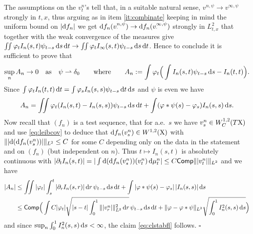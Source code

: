 \documentclass[11pt]{article}
\numberwithin{equation}{section}
\newenvironment{idea}{\removelastskip\par\medskip   %
\noindent{\em Idea of the proof} \rm}{\penalty-20\null\hfill$\square$\par\medbreak}
\newcommand{\X}{{\rm X}}
\renewcommand{\d}{{\rm d}}
\newcommand{\weakto}{\rightharpoonup}
\newcommand{\Comp}{{\sf Comp}}
\begin{document}
\begin{idea}
The  assumptions on the $v^n_t$'s tell that, in a suitable natural sense, $v^{n,\psi}\to v^{\infty,\psi}$ strongly in $t,x$, thus arguing as in item \ref{it:combinate} keeping in mind the uniform bound on $|\d f_n|$ we get $\d f_n(v^{n,\psi}_\cdot)\to \d f_n(v^{\infty,\psi}_\cdot)$ strongly in $L^2_{t,x}$ that together with the weak convergence of the measures give $\iint\varphi_tI_n(s,t)\psi_{t-s}\,\d s\,\d t\to \iint\varphi_tI_\infty(s,t)\psi_{t-s}\,\d s\,\d t$. Hence  to conclude it is sufficient to prove that 
\begin{equation}
\label{eq:clstabfl}
\sup_nA_{n}\to 0\quad\text{as}\quad\psi\weakto\delta_0\qquad\text{where}\qquad A_n:=\int\varphi_t\Big(\int I_n(s,t)\psi_{t-s}\,\d s-I_n(t,t)\Big).
\end{equation}
Since $\int\varphi_tI_n(t,t)\,\d t=\int \varphi_sI_n(s,s)\psi_{t-s}\,\d t\,\d s$ and  $\psi$ is  even we have
\[
\begin{split}
A_{n}=\iint\varphi_t  (I_n(s,t)-I_n(s,s))\psi_{t-s}\,\d s \,\d t +\int (\varphi\ast\psi(s)-\varphi_s)I_n(s,s)\,\d s.
\end{split}
\]
Now recall that $(f_n)$ is a test sequence, that for a.e.\ $s$ we have  $v^n_s\in W^{1,2}_C(T\X)$ and use \eqref{eq:leibcov} to deduce that  $\d f_n(v^n_s)\in W^{1,2}(\X)$ with $\||\d (\d f_n(v^n_s))|\|_{L^2}\leq C$ for some $C$ depending only on the data in the statement and on $(f_n)$ (but independent on $n$). Thus $t\mapsto I_n(s,t)$ is absolutely continuous with $|\partial_tI_n(s,t)|=|\int \d(\d f_n(v^n_s))(v^n_t)\,\d\mu_t^n|\leq C\Comp \||v^n_t|\|_{L^2 }$ and we have
\[
\begin{split}
|A_{n}|&\leq \iint |\varphi_t|\int_s^t|\partial_rI_n(s,r)|\,\d r\,\psi_{t-s}\,\d s\,\d t+\int |\varphi\ast\psi(s)-\varphi_s|\,|I_n(s,s)|\,\d s\\
&\leq \Comp\Big(\int C |\varphi_t|\sqrt{|s-t|\int_0^1 \||v^n_r|\|^2_{L^2}\,\d r} \,\psi_{t-s}\,\d s\,\d t+\|\varphi-\varphi\ast\psi\|_{L^2}\sqrt{\int_0^1I_n^2(s,s)\,\d s}\Big)
\end{split}
\]
and since $\sup_n\int_0^1I_n^2(s,s)\,\d s<\infty$, the claim \eqref{eq:clstabfl} follows.
\end{idea}
\end{document}
